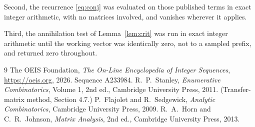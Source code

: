 \documentclass[11pt,a4paper]{article}
\theoremstyle{plain}
\theoremstyle{definition}
\begin{document}
Second, the recurrence \eqref{eq:conj} was evaluated on those published terms in exact
integer arithmetic, with no matrices involved, and vanishes wherever it applies.

Third, the annihilation test of Lemma~\ref{lem:crit} was run in exact integer arithmetic
until the working vector was identically zero, not to a sampled prefix, and returned zero
throughout.

\begin{thebibliography}{9}
 The OEIS Foundation, \emph{The On-Line Encyclopedia of Integer
Sequences}, \url{https://oeis.org}, 2026. Sequence A233984.
 R.~P.~Stanley, \emph{Enumerative Combinatorics}, Volume 1, 2nd ed.,
Cambridge University Press, 2011. (Transfer-matrix method, Section 4.7.)
 P.~Flajolet and R.~Sedgewick, \emph{Analytic Combinatorics}, Cambridge
University Press, 2009.
 R.~A.~Horn and C.~R.~Johnson, \emph{Matrix Analysis}, 2nd ed., Cambridge
University Press, 2013.
\end{thebibliography}
\end{document}
